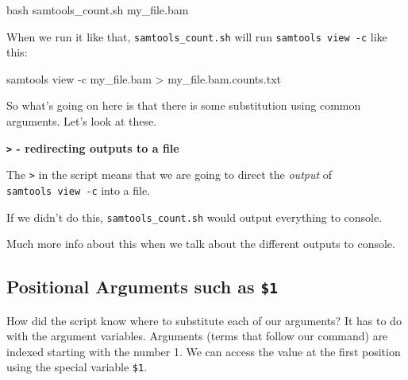 \documentclass[
  letterpaper,
  DIV=11,
  numbers=noendperiod]{scrreprt}
\newenvironment{Shaded}{\begin{snugshade}}{\end{snugshade}}
\newcommand{\AttributeTok}[1]{\textcolor[rgb]{0.40,0.45,0.13}{#1}}
\newcommand{\ExtensionTok}[1]{\textcolor[rgb]{0.00,0.23,0.31}{#1}}
\newcommand{\FunctionTok}[1]{\textcolor[rgb]{0.28,0.35,0.67}{#1}}
\newcommand{\NormalTok}[1]{\textcolor[rgb]{0.00,0.23,0.31}{#1}}
\newcommand{\OperatorTok}[1]{\textcolor[rgb]{0.37,0.37,0.37}{#1}}
\begin{document}
\begin{Shaded}
\begin{Highlighting}[]
\FunctionTok{bash}\NormalTok{ samtools\_count.sh my\_file.bam }
\end{Highlighting}
\end{Shaded}

When we run it like that, \texttt{samtools\_count.sh} will run
\texttt{samtools\ view\ -c} like this:

\begin{Shaded}
\begin{Highlighting}[]
\ExtensionTok{samtools}\NormalTok{ view }\AttributeTok{{-}c}\NormalTok{ my\_file.bam }\OperatorTok{\textgreater{}}\NormalTok{ my\_file.bam.counts.txt}
\end{Highlighting}
\end{Shaded}

So what's going on here is that there is some substitution using common
arguments. Let's look at these.

\begin{tcolorbox}[enhanced jigsaw, breakable, leftrule=.75mm, colframe=quarto-callout-color-frame, left=2mm, toprule=.15mm, arc=.35mm, rightrule=.15mm, opacityback=0, bottomrule=.15mm, colback=white]

\vspace{-3mm}\textbf{\texttt{\textgreater{}} - redirecting outputs to a file}\vspace{3mm}

The \texttt{\textgreater{}} in the script means that we are going to
direct the \emph{output} of \texttt{samtools\ view\ -c} into a file.

If we didn't do this, \texttt{samtools\_count.sh} would output
everything to console.

Much more info about this when we talk about the different outputs to
console.

\end{tcolorbox}

\subsection{\texorpdfstring{Positional Arguments such as
\texttt{\$1}}{Positional Arguments such as \$1}}\label{positional-arguments-such-as-1}

How did the script know where to substitute each of our arguments? It
has to do with the argument variables. Arguments (terms that follow our
command) are indexed starting with the number 1. We can access the value
at the first position using the special variable \texttt{\$1}.
\end{document}
